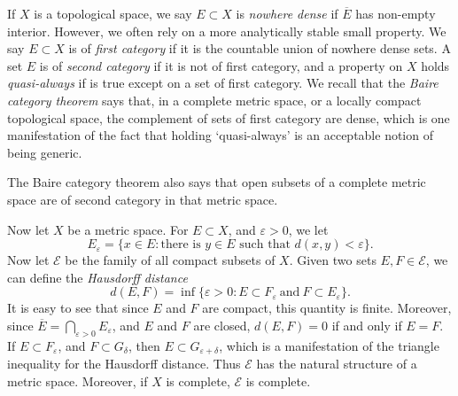 If $X$ is a topological space, we say $E \subset X$ is \emph{nowhere dense} if $\overline{E}$ has non-empty interior. However, we often rely on a more analytically stable small property. We say $E \subset X$ is of \emph{first category} if it is the countable union of nowhere dense sets. A set $E$ is of \emph{second category} if it is not of first category, and a property on $X$ holds \emph{quasi-always} if is true except on a set of first category. We recall that the \emph{Baire category theorem} says that, in a complete metric space, or a locally compact topological space, the complement of sets of first category are dense, which is one manifestation of the fact that holding `quasi-always' is an acceptable notion of being generic.

\begin{remark}
	The Baire category theorem also says that open subsets of a complete metric space are of second category in that metric space.
\end{remark}

Now let $X$ be a metric space. For $E \subset X$, and $\varepsilon > 0$, we let
%
\[ E_\varepsilon = \{ x \in E: \text{there is $y \in E$ such that $d(x,y) < \varepsilon$} \}. \]
%
Now let $\mathcal{E}$ be the family of all compact subsets of $X$. Given two sets $E, F \in \mathcal{E}$, we can define the \emph{Hausdorff distance}
%
\[ d(E,F) = \inf \{ \varepsilon > 0: E \subset F_\varepsilon\ \text{and}\ F \subset E_\varepsilon \}. \]
%
It is easy to see that since $E$ and $F$ are compact, this quantity is finite. Moreover, since $\overline{E} = \bigcap_{\varepsilon > 0} E_\varepsilon$, and $E$ and $F$ are closed, $d(E,F) = 0$ if and only if $E = F$. If $E \subset F_\varepsilon$, and $F \subset G_\delta$, then $E \subset G_{\varepsilon + \delta}$, which is a manifestation of the triangle inequality for the Hausdorff distance. Thus $\mathcal{E}$ has the natural structure of a metric space. Moreover, if $X$ is complete, $\mathcal{E}$ is complete.

